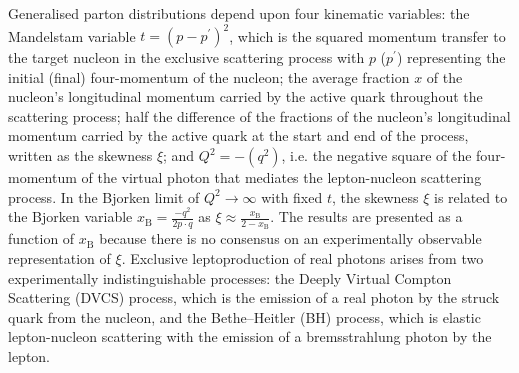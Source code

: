 \documentclass[11pt,a4paper]{article}
\begin{document}
Generalised parton distributions depend upon four kinematic variables: the
Mandelstam variable $t=(p-p^{\prime})^2$, which is the squared momentum
transfer to the target nucleon in the exclusive scattering process with $p$ ($p^{\prime}$)
representing the initial (final) four-momentum of the nucleon; the average
fraction $x$ of the nucleon's longitudinal momentum carried by the active
quark throughout the scattering process; half the difference of
  the fractions of the nucleon's longitudinal momentum carried
by the active quark at the start and end of the process, written as
the skewness $\xi$; and $Q^2=-(q^2)$, i.e. the negative square of the four-momentum of
the virtual photon that mediates the lepton-nucleon scattering
process. In the Bjorken limit of $Q^2\rightarrow\infty$ with fixed
$t$, the skewness $\xi$ is related to the Bjorken variable
$x_{\textrm{B}}=\frac{-q^2}{2p\cdot q}$ as
$\xi\approx\frac{x_\textrm{B}}{2-x_\textrm{B}}$. The results are presented
as a function of $x_{\textrm{B}}$ because there is no consensus on an experimentally observable representation of $\xi$. 
Exclusive leptoproduction of real photons
 arises from
two experimentally indistinguishable processes: the Deeply Virtual Compton Scattering (DVCS) process,
which is the emission of a real photon by the struck quark from the nucleon, and the Bethe--Heitler (BH) process, which is elastic lepton-nucleon scattering with the emission of a bremsstrahlung photon by the lepton.
\end{document}
